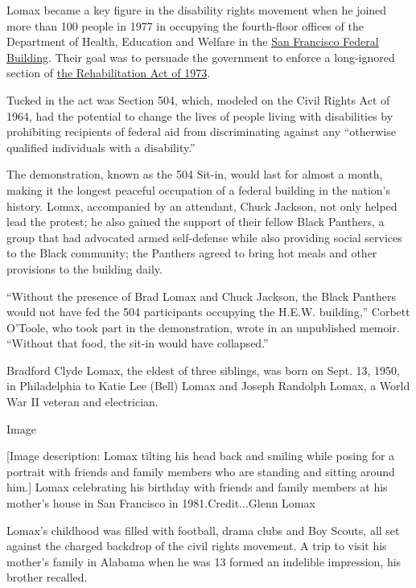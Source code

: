 Lomax became a key figure in the disability rights movement when he
joined more than 100 people in 1977 in occupying the fourth-floor
offices of the Department of Health, Education and Welfare in the
\href{https://www.gsa.gov/historic-buildings/federal-building-san-francisco-ca}{San
Francisco Federal Building}. Their goal was to persuade the government
to enforce a long-ignored section of
\href{https://www2.ed.gov/policy/speced/reg/narrative.html}{the
Rehabilitation Act of 1973}.

Tucked in the act was Section 504, which, modeled on the Civil Rights
Act of 1964, had the potential to change the lives of people living with
disabilities by prohibiting recipients of federal aid from
discriminating against any ``otherwise qualified individuals with a
disability.''

The demonstration, known as the 504 Sit-in, would last for almost a
month, making it the longest peaceful occupation of a federal building
in the nation's history. Lomax, accompanied by an attendant, Chuck
Jackson, not only helped lead the protest; he also gained the support of
their fellow Black Panthers, a group that had advocated armed
self-defense while also providing social services to the Black
community; the Panthers agreed to bring hot meals and other provisions
to the building daily.

``Without the presence of Brad Lomax and Chuck Jackson, the Black
Panthers would not have fed the 504 participants occupying the H.E.W.
building,'' Corbett O'Toole, who took part in the demonstration, wrote
in an unpublished memoir. ``Without that food, the sit-in would have
collapsed.''

Bradford Clyde Lomax, the eldest of three siblings, was born on Sept.
13, 1950, in Philadelphia to Katie Lee (Bell) Lomax and Joseph Randolph
Lomax, a World War II veteran and electrician.

Image

{[}Image description: Lomax tilting his head back and smiling while
posing for a portrait with friends and family members who are standing
and sitting around him.{]} Lomax celebrating his birthday with friends
and family members at his mother's house in San Francisco in
1981.Credit...Glenn Lomax

Lomax's childhood was filled with football, drama clubs and Boy Scouts,
all set against the charged backdrop of the civil rights movement. A
trip to visit his mother's family in Alabama when he was 13 formed an
indelible impression, his brother recalled.

